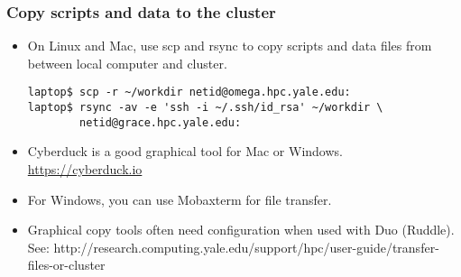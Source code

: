 \documentclass[10pt]{beamer}
\begin{document}
\begin{frame}[fragile]
\frametitle{Copy scripts and data to the cluster}
\begin{itemize}
\item On Linux and Mac, use scp and rsync
to copy scripts and data files from between local computer and cluster.

\begin{verbatim}
laptop$ scp -r ~/workdir netid@omega.hpc.yale.edu:
laptop$ rsync -av -e 'ssh -i ~/.ssh/id_rsa' ~/workdir \
        netid@grace.hpc.yale.edu:
\end{verbatim}

\item Cyberduck is a good graphical tool for Mac or Windows.  \url{https://cyberduck.io}

\item For Windows, you can use Mobaxterm for file transfer. 

\item Graphical copy tools often need configuration when used with Duo (Ruddle).  See:
http://research.computing.yale.edu/support/hpc/user-guide/transfer-files-or-cluster
\end{itemize}

\end{frame}
\end{document}
